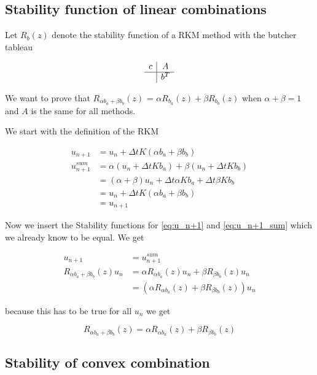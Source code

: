 \documentclass{article}
\begin{document}
\subsection{Stability function of linear combinations}\label{proof:combiningb}
Let $R_b(z)$ denote the stability function of a RKM method with the butcher tableau

$$
\begin{array}
{c|c}
c & A\\
\hline
& b^T
\end{array}
$$

We want to prove that $R_{\alpha b_a+\beta b_b}(z)$ = $\alpha R_{ b_a}(z)+\beta R_{b_b}(z)$ when $\alpha + \beta = 1$ and $A$ is the same for all methods.

We start with the definition of the RKM

\begin{align}
u_{n+1} &= u_n + \Delta t K (\alpha b_a+\beta b_b) \label{eq:u_n+1}  \\
u_{n+1}^{sum} &= \alpha (u_n + \Delta t K b_a) + \beta (u_n + \Delta t K b_b) \label{eq:u_n+1_sum} \\
& = (\alpha + \beta) u_n + \Delta t \alpha K b_a + \Delta t \beta K b_b \\
&= u_n + \Delta t K (\alpha b_a+\beta b_b) \\
&=u_{n+1} 
\end{align}

Now we insert the Stability functions for \ref{eq:u_n+1} and \ref{eq:u_n+1_sum} which we already know to be equal. We get 

\begin{align}
u_{n+1} &= u_{n+1}^{sum} \\
R_{\alpha b_a+\beta b_b}(z) u_n &= \alpha R_{\alpha b_a}(z) u_n + \beta R_{\beta b_b}(z) u_n \\
&= (\alpha R_{\alpha b_a}(z) + \beta R_{\beta b_b}(z)) u_n
\end{align}

because this has to be true for all $u_n$ we get

\begin{equation}
R_{\alpha b_a+\beta b_b}(z) = \alpha R_{\alpha b_a}(z) + \beta R_{\beta b_b}(z) 
\end{equation}

\subsection{Stability of convex combination}\label{proof:convex_comb}
\end{document}
